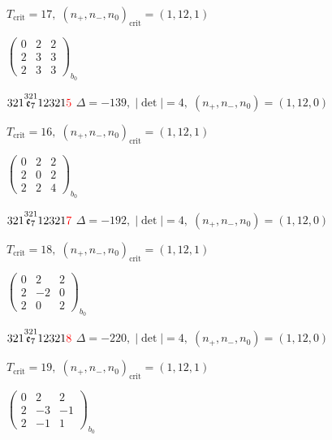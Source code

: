 \documentclass[10pt]{article}
\begin{document}
\hspace{1em}$T_{\text{crit}}=17,\; (n_+,n_-,n_0)_{\text{crit}}=(1,12,1)$

\hspace{2em}$\left(\begin{smallmatrix}0 & 2 & 2 \\ 2 & 3 & 3 \\ 2 & 3 & 3\end{smallmatrix}\right)_{\!b_0}$

\smallskip

$321\overset{321}{\mathfrak{e}_7}12321\textcolor{red}{5}$ \quad $\Delta=-139,\; |\det|=4,\; (n_+,n_-,n_0)=(1,12,0)$

\hspace{1em}$T_{\text{crit}}=16,\; (n_+,n_-,n_0)_{\text{crit}}=(1,12,1)$

\hspace{2em}$\left(\begin{smallmatrix}0 & 2 & 2 \\ 2 & 0 & 2 \\ 2 & 2 & 4\end{smallmatrix}\right)_{\!b_0}$

$321\overset{321}{\mathfrak{e}_7}12321\textcolor{red}{7}$ \quad $\Delta=-192,\; |\det|=4,\; (n_+,n_-,n_0)=(1,12,0)$

\hspace{1em}$T_{\text{crit}}=18,\; (n_+,n_-,n_0)_{\text{crit}}=(1,12,1)$

\hspace{2em}$\left(\begin{smallmatrix}0 & 2 & 2 \\ 2 & -2 & 0 \\ 2 & 0 & 2\end{smallmatrix}\right)_{\!b_0}$

$321\overset{321}{\mathfrak{e}_7}12321\textcolor{red}{8}$ \quad $\Delta=-220,\; |\det|=4,\; (n_+,n_-,n_0)=(1,12,0)$

\hspace{1em}$T_{\text{crit}}=19,\; (n_+,n_-,n_0)_{\text{crit}}=(1,12,1)$

\hspace{2em}$\left(\begin{smallmatrix}0 & 2 & 2 \\ 2 & -3 & -1 \\ 2 & -1 & 1\end{smallmatrix}\right)_{\!b_0}$
\end{document}
